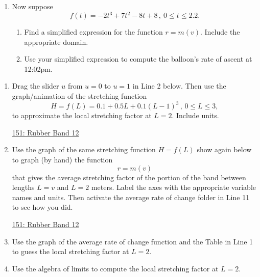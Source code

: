 \documentclass{ximera}
\begin{document}
\begin{question}
\begin{enumerate}
\item Now suppose
\[
   f(t) = -2t^3+7t^2-8t+8 \, , \ 0\leq t \leq 2.2.
\]

\begin{enumerate}
\item Find a simplified expression for the function $r=m(v)$. Include the appropriate domain.

\item Use your simplified expression to compute the balloon's rate of ascent at 12:02pm.
\end{enumerate}

\end{enumerate}
\end{question}

\begin{question}  \label{Qdfsa4555}

\begin{enumerate}

\item Drag the slider $u$ from $u=0$ to $u=1$ in Line 2 below. Then use the graph/animation of the stretching function
\[
   H = f(L) = 0.1 +0.5L + 0.1(L-1)^3 \, , \, 0\leq L \leq 3 ,
\]
to approximate the local stretching factor at $L=2$. Include units. 

\begin{onlineOnly}
    \begin{center}
\end{center}
\end{onlineOnly}

\href{https://www.desmos.com/calculator/boubpczsne}{151: Rubber Band 12}

\item Use the graph of the same stretching function $H=f(L)$ show again below to graph (by hand) the function
\[
    r = m(v)
\]
that gives the average stretching factor of the portion of the band between lengths $L=v$ and $L=2$ meters. Label the axes with the appropriate variable names and units. Then activate the average rate of change folder in Line 11 to see how you did.

\begin{onlineOnly}
    \begin{center}
\end{center}
\end{onlineOnly}

\href{https://www.desmos.com/calculator/vss7ofbwii}{151: Rubber Band 12}

\item Use the graph of the average rate of change function and the Table in Line 1 to guess the local stretching factor at $L=2$.

\item Use the algebra of limits to compute the local stretching factor at $L=2$.


\end{enumerate}


\end{question}
\end{document}
